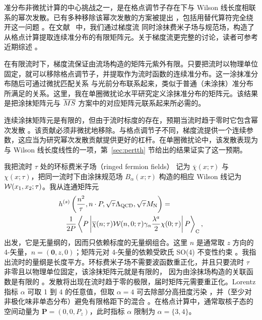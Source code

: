 准分布非微扰计算的中心挑战之一，是在格点调节子存在下与 Wilson 线长度相联系的幂次发散。已有多种移除该幂次发散的方案被提出 \cite{Chen:2016fxx,Ishikawa:2016znu,Chen:2017mzz,Alexandrou:2017huk,Orginos:2017kos}，包括用替代算符完全绕开这一问题 \cite{Aglietti:1998ur,Abada:2001if,Detmold:2005gg,Braun:2007wv,Bali:2017gfr}。在文献~\cite{Monahan:2016bvm} 中，我们通过梯度流 \cite{Narayanan:2006rf,Luscher:2011bx,Luscher:2013cpa} 同时涂抹费米子场与规范场，构造了从格点计算提取连续准分布的有限矩阵元。关于梯度流更完整的讨论，读者可参考近期综述 \cite{Luscher:2013vga,Ramos:2015dla}。

在有限流时下，梯度流保证由流场构造的矩阵元紫外有限。只要把流时以物理单位固定，就可以移除格点调节子，并提取作为流时函数的连续准分布。这一涂抹准分布随后可通过微扰匹配关系 \cite{Monahan:2016bvm} 与光前分布联系起来，类似于普通（未涂抹）准分布所满足的关系。这里，我在单圈微扰论水平研究定义涂抹准分布的矩阵元。该结果是把涂抹矩阵元与 $\overline{MS}$ 方案中的对应矩阵元联系起来所必需的。

连续涂抹矩阵元是有限的，但由于流时标度的存在，预期当流时趋于零时它包含幂次发散 \cite{Monahan:2016bvm}。该贡献必须非微扰地移除。与格点调节子不同，梯度流提供一个连续参数，这应当为研究幂次发散贡献提供更好的杠杆。在单圈微扰论中，该发散表现为与 Wilson 线长度线性的一项，第~\ref{sec:pertth} 节给出的结果证实了这一预期。

我把流时 $\tau$ 处的环标费米子场（ringed fermion fields）\cite{Makino:2014taa,Hieda:2016lly} 记为 $\overline{\chi}(x;\tau)$ 与 $\chi(x;\tau)$，把同一流时下由涂抹规范场 $B_\alpha(x;\tau)$ 构造的相应 Wilson 线记为 ${\bf\cal W}(x_1,x_2;\tau)$。我从连通矩阵元
\begin{align}\label{eq:hdef}
{} & h^{(s)}\left(\frac{n^2}{\tau},n\cdot P,
\sqrt{\tau}\Lambda_{\mathrm{QCD}},\sqrt{\tau}M_\mathrm{N}\right) = \nonumber\\
{} & \quad
\frac{1}{2P}\left\langle
P \left| \overline{\chi}(n;\tau)
{\bf\cal W}(n,0;\tau)\gamma_\alpha\frac{\lambda^a}{2}\chi(0;\tau)\right|
P\right\rangle_\mathrm{C},
\end{align}
出发，它是无量纲的，因而只依赖标度的无量纲组合。这里 $n$ 是通常取 $z$ 方向的 4-矢量，$n = (\mathbf{0},z,0)$；矩阵元对 4-矢量的依赖受欧氏 SO(4) 不变性约束 \cite{Radyushkin:2016hsy}。我指出流时的量纲是长度平方。环标费米子场不需要波函数重正化，并且只要流时 $\tau$ 非零且以物理单位固定，该涂抹矩阵元就是有限的，
因为由涂抹场构造的关联函数是有限的 \cite{Luscher:2011bx,Luscher:2013cpa}。发散将出现在流时趋于零的极限，届时矩阵元需要重正化。Lorentz 指标 $\alpha$ 可取 1 到 4 的任意值，但取 $\alpha = 4$ 可去除部分高扭度污染 \cite{Radyushkin:2016hsy}，并（至少对非极化味非单态分布）避免有限格距下的混合 \cite{Constantinou:2017sej}。在格点计算中，通常取核子态的空间动量为 $\mathbf{P} = (0,0,P_z)$，此时指标 $\alpha$ 限制为 $\alpha = \{3,4\}$。

